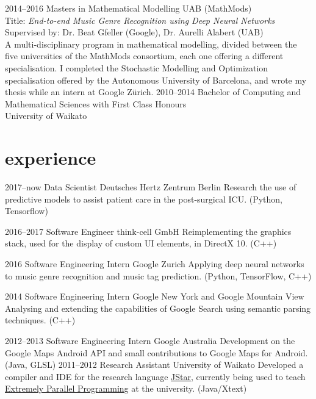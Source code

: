 \documentclass[]{boris-cv}
\begin{document}
\begin{entrylist}
  \entry
    {2014--2016}
    {Masters in Mathematical Modelling }
    {UAB (MathMods)}
    {\vspace{-2.5mm} \\ Title: \textit{End-to-end Music Genre Recognition using Deep Neural Networks}\\
    \footnotesize{Supervised by: Dr. Beat Gfeller (Google), Dr. Aurelli Alabert (UAB)}\\
    A multi-disciplinary program in mathematical modelling, divided between
    the five universities of the MathMods consortium, each one offering a
    different specialisation. I completed the Stochastic Modelling and Optimization
    specialisation offered by the Autonomous University of Barcelona,
    and wrote my thesis while an intern at Google Z\"{u}rich.}
  \entry
    {2010--2014}
    {Bachelor of Computing and Mathematical Sciences with First Class Honours \\}
    {University of Waikato}
	{\vspace{-5mm}}%
\end{entrylist}

\section{experience}

\begin{entrylist}
  \entry
    {2017--now}
    {Data Scientist}
    {Deutsches Hertz Zentrum Berlin}
    {Research the use of predictive models to assist patient care in the
				post-surgical ICU. (Python, Tensorflow)}

  \entry
    {2016--2017}
    {Software Engineer}
    {think-cell GmbH}
    {Reimplementing the graphics stack, used for the display of custom
        UI elements, in DirectX 10. (C++)}

  \entry
    {2016}
    {Software Engineering Intern}
    {Google Zurich}
    {Applying deep neural networks to music genre recognition and music tag
		prediction. (Python, TensorFlow, C++)}

  \entry
    {2014}
    {Software Engineering Intern}
    {Google New York and Google Mountain View}
    {Analysing and extending the capabilities of Google Search
    using semantic parsing techniques. (C++)}

  \entry
    {2012--2013}
    {Software Engineering Intern}
    {Google Australia}
    {Development on the Google Maps Android API
    and small contributions to Google Maps for Android. (Java, GLSL)}
  \entry
    {2011--2012}
    {Research Assistant}
    {University of Waikato}
    {Developed a compiler and IDE for the research language
    \href{http://www.cs.waikato.ac.nz/research/jstar/}{JStar}, currently being used to teach
    \href{http://papers.waikato.ac.nz/subjects/COMP/COMP553}
    {Extremely Parallel Programming} at the university. (Java/Xtext)}

\end{entrylist}
\end{document}
